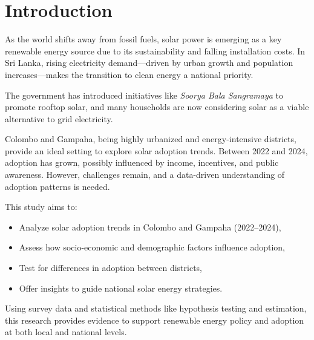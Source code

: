 \documentclass[12pt,a4paper]{article}
\begin{document}
\clearpage
\tableofcontents
\clearpage

\section{Introduction}

As the world shifts away from fossil fuels, solar power is emerging as a key renewable energy source due to its sustainability and falling installation costs. In Sri Lanka, rising electricity demand—driven by urban growth and population increases—makes the transition to clean energy a national priority.

The government has introduced initiatives like \textit{Soorya Bala Sangramaya} to promote rooftop solar, and many households are now considering solar as a viable alternative to grid electricity.

Colombo and Gampaha, being highly urbanized and energy-intensive districts, provide an ideal setting to explore solar adoption trends. Between 2022 and 2024, adoption has grown, possibly influenced by income, incentives, and public awareness. However, challenges remain, and a data-driven understanding of adoption patterns is needed.

This study aims to:
\begin{itemize}[noitemsep,topsep=0pt]
    \item Analyze solar adoption trends in Colombo and Gampaha (2022--2024),
    \item Assess how socio-economic and demographic factors influence adoption,
    \item Test for differences in adoption between districts,
    \item Offer insights to guide national solar energy strategies.
\end{itemize}

Using survey data and statistical methods like hypothesis testing and estimation, this research provides evidence to support renewable energy policy and adoption at both local and national levels.


\end{document}

